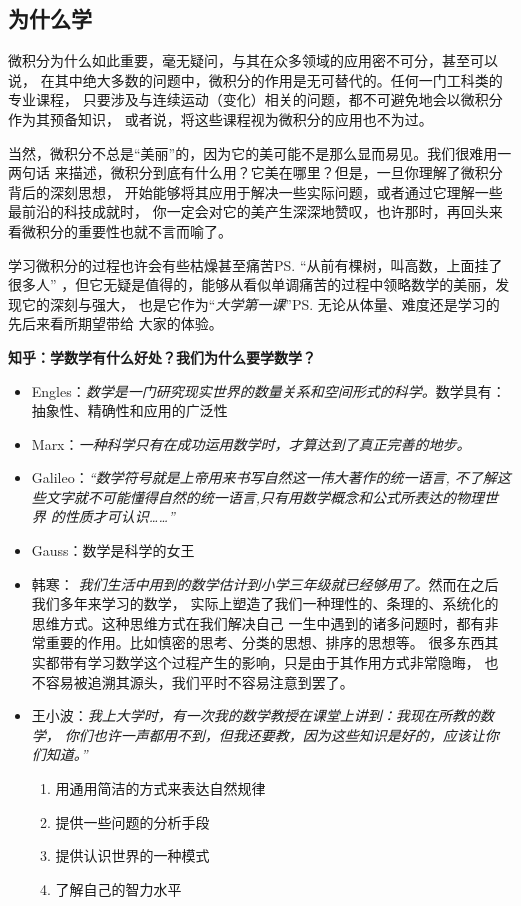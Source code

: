 \subsection{为什么学}

微积分为什么如此重要，毫无疑问，与其在众多领域的应用密不可分，甚至可以说，
在其中绝大多数的问题中，微积分的作用是无可替代的。任何一门工科类的专业课程，
只要涉及与连续运动（变化）相关的问题，都不可避免地会以微积分作为其预备知识，
或者说，将这些课程视为微积分的应用也不为过。

当然，微积分不总是“美丽”的，因为它的美可能不是那么显而易见。我们很难用一两句话
来描述，微积分到底有什么用？它美在哪里？但是，一旦你理解了微积分背后的深刻思想，
开始能够将其应用于解决一些实际问题，或者通过它理解一些最前沿的科技成就时，
你一定会对它的美产生深深地赞叹，也许那时，再回头来看微积分的重要性也就不言而喻了。

学习微积分的过程也许会有些枯燥甚至痛苦\ps{“从前有棵树，叫高数，上面挂了很多人”}
，但它无疑是值得的，能够从看似单调痛苦的过程中领略数学的美丽，发现它的深刻与强大，
也是它作为“{\it 大学第一课}”\ps{无论从体量、难度还是学习的先后来看}所期望带给
大家的体验。

\begin{shaded}
	{\bf 知乎：学数学有什么好处？我们为什么要学数学？}
	\begin{itemize}
	  \item Engles：{\it 数学是一门研究现实世界的数量关系和空间形式的科学。}数学具有：
	  抽象性、精确性和应用的广泛性
	  \item Marx：{\it 一种科学只有在成功运用数学时，才算达到了真正完善的地步。}
	  \item Galileo：{\it “数学符号就是上帝用来书写自然这一伟大著作的统一语言,
	  不了解这些文字就不可能懂得自然的统一语言,只有用数学概念和公式所表达的物理世界
	  的性质才可认识……”}
	  \item Gauss：{数学是科学的女王}
	  \item 韩寒：{\it
	  我们生活中用到的数学估计到小学三年级就已经够用了。}然而在之后我们多年来学习的数学，
	  实际上塑造了我们一种理性的、条理的、系统化的思维方式。这种思维方式在我们解决自己
	  一生中遇到的诸多问题时，都有非常重要的作用。比如慎密的思考、分类的思想、排序的思想等。
	  很多东西其实都带有学习数学这个过程产生的影响，只是由于其作用方式非常隐晦，
	  也不容易被追溯其源头，我们平时不容易注意到罢了。
	  \item 王小波：{\it 我上大学时，有一次我的数学教授在课堂上讲到：我现在所教的数学，
	  你们也许一声都用不到，但我还要教，因为这些知识是好的，应该让你们知道。”}
	  \begin{enumerate}
	  	\item 用通用简洁的方式来表达自然规律
	  	\item 提供一些问题的分析手段
	  	\item 提供认识世界的一种模式
	  	\item 了解自己的智力水平
	  \end{enumerate}
	\end{itemize}
\end{shaded}

